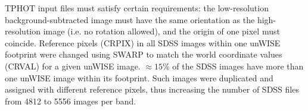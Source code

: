 \documentclass[numberedappendix,apj,twocolumn]{emulateapj}
\begin{document}
TPHOT input files must satisfy certain requirements: the low-resolution background-subtracted image must have the same orientation as the high-resolution image (i.e. no rotation allowed), and the origin of one pixel must coincide. Reference pixels (CRPIX) in all SDSS images within one unWISE footprint were changed using SWARP \citep{Bertin2002} to match the world coordinate values (CRVAL) for a given unWISE image. $\approx15\%$ of the SDSS images have more than one unWISE image within its footprint. Such images were duplicated and assigned with different reference pixels, thus increasing the number of SDSS files from  4812 to 5556 images per band.


 
\end{document}
